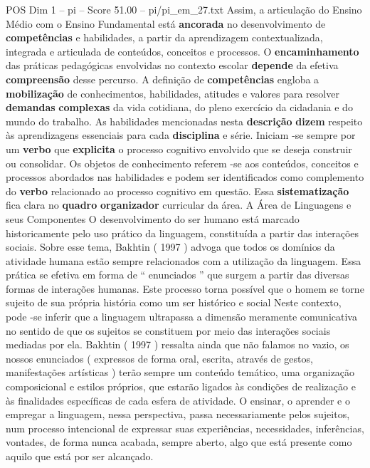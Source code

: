 \begin{textsample}{POS Dim 1 – pi – Score 51.00 – pi/pi\_em\_27.txt}
Assim, a articulação do Ensino Médio com o Ensino Fundamental está \textbf{ancorada} no desenvolvimento de \textbf{competências} e habilidades, a partir da aprendizagem contextualizada, integrada e articulada de conteúdos, conceitos e processos.
O \textbf{encaminhamento} das práticas pedagógicas envolvidas no contexto escolar \textbf{depende} da efetiva \textbf{compreensão} desse percurso.
A definição de \textbf{competências} engloba a \textbf{mobilização} de conhecimentos, habilidades, atitudes e valores para resolver \textbf{demandas} \textbf{complexas} da vida cotidiana, do pleno exercício da cidadania e do mundo do trabalho.
As habilidades mencionadas nesta \textbf{descrição} \textbf{dizem} respeito às aprendizagens essenciais para cada \textbf{disciplina} e série.
Iniciam -se sempre por um \textbf{verbo} que \textbf{explicita} o processo cognitivo envolvido que se deseja construir ou consolidar.
Os objetos de conhecimento referem -se aos conteúdos, conceitos e processos abordados nas habilidades e podem ser identificados como complemento do \textbf{verbo} relacionado ao processo cognitivo em questão.
Essa \textbf{sistematização} fica clara no \textbf{quadro} \textbf{organizador} curricular da área.
A Área de Linguagens e seus Componentes O desenvolvimento do ser humano está marcado historicamente pelo uso prático da linguagem, constituída a partir das interações sociais.
Sobre esse tema, Bakhtin ( 1997 ) advoga que todos os domínios da atividade humana estão sempre relacionados com a utilização da linguagem.
Essa prática se efetiva em forma de “ enunciados ” que surgem a partir das diversas formas de interações humanas.
Este processo torna possível que o homem se torne sujeito de sua própria história como um ser histórico e social Neste contexto, pode -se inferir que a linguagem ultrapassa a dimensão meramente comunicativa no sentido de que os sujeitos se constituem por meio das interações sociais mediadas por ela.
Bakhtin ( 1997 ) ressalta ainda que não falamos no vazio, os nossos enunciados ( expressos de forma oral, escrita, através de gestos, manifestações artísticas ) terão sempre um conteúdo temático, uma organização composicional e estilos próprios, que estarão ligados às condições de realização e às finalidades específicas de cada esfera de atividade.
O ensinar, o aprender e o empregar a linguagem, nessa perspectiva, passa necessariamente pelos sujeitos, num processo intencional de expressar suas experiências, necessidades, inferências, vontades, de forma nunca acabada, sempre aberto, algo que está presente como aquilo que está por ser alcançado.

\end{textsample}
